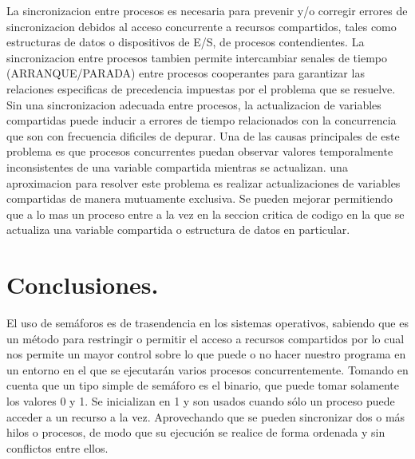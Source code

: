\documentclass[12pt]{article}
\begin{document}
La sincronizacion entre procesos es necesaria para prevenir y/o corregir errores de sincronizacion debidos al acceso concurrente a recursos compartidos, tales como estructuras de datos o dispositivos de E/S, de procesos contendientes. La sincronizacion entre procesos tambien permite intercambiar senales de tiempo (ARRANQUE/PARADA) entre procesos cooperantes para garantizar las relaciones especificas de precedencia impuestas por el problema que se resuelve.
Sin una sincronizacion adecuada entre procesos, la actualizacion de variables compartidas puede inducir a errores de tiempo relacionados con la concurrencia que son con frecuencia dificiles de depurar. Una de las causas principales de este problema es que procesos concurrentes puedan observar valores temporalmente inconsistentes de una variable compartida mientras se actualizan. una aproximacion para resolver este problema es realizar actualizaciones de variables compartidas de manera mutuamente exclusiva. Se pueden mejorar permitiendo que a lo mas un proceso entre a la vez en la seccion critica de codigo en la que se actualiza una variable compartida o estructura de datos en particular.

\section{Conclusiones.}

El uso de semáforos es de trasendencia en los sistemas operativos, sabiendo que es un método para restringir o permitir el acceso a recursos compartidos por lo cual nos permite un mayor control sobre lo que puede o no hacer nuestro programa en un entorno en el que se ejecutarán varios procesos concurrentemente. Tomando en cuenta que un tipo simple de semáforo es el binario, que puede tomar solamente los valores 0 y 1. Se inicializan en 1 y son usados cuando sólo un proceso puede acceder a un recurso a la vez. Aprovechando que se pueden sincronizar dos o más hilos o procesos, de modo que su ejecución se realice de forma ordenada y sin conflictos entre ellos.
\end{document}
